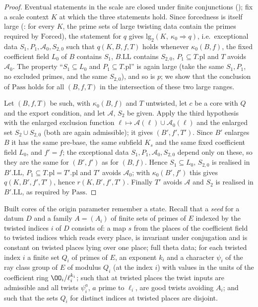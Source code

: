 \begin{proof}
Eventual statements in the scale are closed under finite conjunctions
(); fix a scale context $K$ at which the three statements hold.
Since forcedness is itself large (: for every $K$,
the prime sets of large twisting data contain the primes required by $\mathrm{Forced}$), the statement for
$q$ gives $\mathrm{lg}_2(K,\ \kappa_0\Rightarrow q)$, i.e.\ exceptional data $S_1,P_1,\mathcal A_0,S_{2,0}$
such that $q(K,B,f,T)$ holds whenever $\kappa_0(B,f)$, the fixed coefficient field $L_0$ of $B$ contains
$S_1$, $B.\mathrm{LL}$ contains $S_{2,0}$, $P_1\subseteq T.\mathrm{pl}$ and $T$ avoids $\mathcal A_0$. The
property ``$S_1\subseteq L_0$ and $P_1\subseteq T.\mathrm{pl}$'' is again large (take the same $S_1,P_1$, no
excluded primes, and the same $S_{2,0}$), and so is $p$; we show that the conclusion of $\mathrm{Pass}$ holds
for all $(B,f,T)$ in the intersection of these two large ranges.

Let $(B,f,T)$ be such, with $\kappa_0(B,f)$ and $T$ untwisted, let $c$ be a core with $Q$ and
the export condition, and let $\mathcal A$, $S_2$ be given. Apply the third hypothesis with the enlarged
exclusion function $\ell\mapsto\mathcal A(\ell)\cup\mathcal A_0(\ell)$ and the enlarged set
$S_2\cup S_{2,0}$ (both are again admissible); it gives $(B',f',T')$. Since $B'$ enlarges $B$ it has the
same pre-base, the same subfield $K_s$ and the same fixed coefficient field $L_0$, and $f'=f$; the
exceptional data $S_1,P_1,\mathcal A_0,S_{2,0}$ depend only on these, so they are the same for $(B',f')$ as for
$(B,f)$. Hence $S_1\subseteq L_0$, $S_{2,0}$ is realised in $B'.\mathrm{LL}$, $P_1\subseteq T.\mathrm{pl}=T'.\mathrm{pl}$
and $T'$ avoids $\mathcal A_0$; with $\kappa_0(B',f')$ this gives $q(K,B',f',T')$, hence
$r(K,B',f',T')$. Finally $T'$ avoids $\mathcal A$ and $S_2$ is realised in $B'.\mathrm{LL}$, as required by
$\mathrm{Pass}$.
\end{proof}

Built cores of the origin parameter remember a state. Recall that a \emph{seed} for a datum $D$ and a
family $A=(A_i)$ of finite sets of primes of $E$ indexed by the twisted indices $i$ of $D$
consists of: a map $s$ from the places of the coefficient
field to twisted indices which reads every place, is invariant under conjugation and is constant on
twisted places lying over one place; full theta data; for each twisted index $i$ a finite
set $Q_i$ of primes of $E$, an exponent $k_i$ and a character $\psi_i$ of the ray class group of $E$ of
modulus $Q_i$ (at the index $i$) with values in the units of the coefficient ring $\OO_i/\ell_i^{k_i}$;
such that at twisted places the twist inputs are admissible and all twists $\psi_i^a$, $a$ prime to
$\ell_i$, are good twists avoiding $A_i$; and such that the sets $Q_i$ for distinct indices at twisted
places are disjoint.

